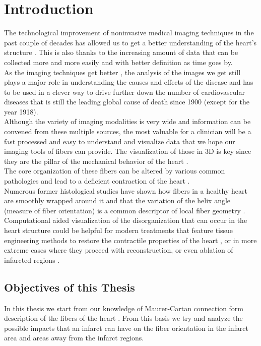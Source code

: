\chapter{Introduction}

The technological improvement of noninvasive medical imaging techniques in the past couple of decades has allowed us to get a better understanding of the heart's structure \cite{sinusas2008multimodality}. This is also thanks to the increasing amount of data that can be collected more and more easily and with better definition as time goes by. \\
As the imaging techniques get better \cite{shaw2010cardiovascular}, the analysis of the images we get still plays a major role in understanding the causes and effects of the disease and has to be used in a clever way to drive further down the number of cardiovascular diseases that is still the leading global cause of death \cite{mozaffarian2015heart} since 1900 (except for the year 1918). \\
Although the variety of imaging modalities is very wide and information can be convened from these multiple sources, the most valuable for a clinician will be a fast processed and easy to understand and visualize data that we hope our imaging tools of fibers can provide. The visualization of those in 3D is key since they are the pillar of the mechanical behavior of the heart \cite{hooks2002cardiac}.\\
The core organization of these fibers can be altered by various common pathologies and lead to a deficient contraction of the heart \cite{beg2004computational}. \\
Numerous former histological studies have shown how fibers in a healthy heart are smoothly wrapped around it and that the variation of the helix angle (measure of fiber orientation) is a common descriptor of local fiber geometry \cite{geerts2002characterization}. Computational aided visualization of the disorganization that can occur in the heart structure could be helpful for modern treatments that feature tissue engineering methods to restore the contractile properties of the heart \cite{caplan2006mesenchymal,laflamme2007cardiomyocytes,laflamme2005regenerating, song2012heart, zimmermann2004engineered}, or in more extreme cases where they proceed with reconstruction, or even ablation of infarcted regions \cite{athanasuleas2004surgical, di2001effects, jones2009coronary, sartipy2005dor}.

\section{Objectives of this Thesis}

In this thesis we start from our knowledge of Maurer-Cartan connection form description of the fibers of the heart \cite{7053934}. From this basis we try and analyze the possible impacts that an infarct can have on the fiber orientation in the infarct area and areas away from the infarct regions.